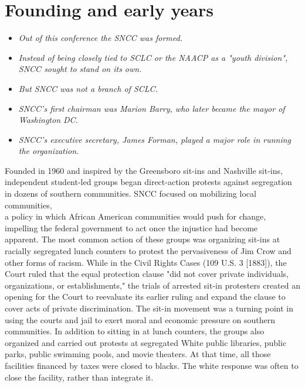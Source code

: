 \section{Founding and early years}\label{founding-and-early-years}

\begin{itemize}
\item
  \emph{Out of this conference the SNCC was formed.}
\item
  \emph{Instead of being closely tied to SCLC or the NAACP as a "youth
  division", SNCC sought to stand on its own.}
\item
  \emph{But SNCC was not a branch of SCLC.}
\item
  \emph{SNCC's first chairman was Marion Barry, who later became the
  mayor of Washington DC.}
\item
  \emph{SNCC's executive secretary, James Forman, played a major role in
  running the organization.}
\end{itemize}

Founded in 1960 and inspired by the Greensboro sit-ins and Nashville
sit-ins, independent student-led groups began direct-action protests
against segregation in dozens of southern communities. SNCC focused on
mobilizing local communities,\\
a policy in which African American communities would push for change,\\
impelling the federal government to act once the injustice had become\\
apparent. The most common action of these groups was organizing sit-ins
at racially segregated lunch counters to protest the pervasiveness of
Jim Crow and other forms of racism. While in the Civil Rights Cases (109
U.S. 3 {[}1883{]}), the Court ruled that the equal protection clause
"did not cover private individuals, organizations, or establishments,"
the trials of arrested sit-in protesters created an opening for the
Court to reevaluate its earlier ruling and expand the clause to cover
acts of private discrimination. The sit-in movement was a turning point
in using the courts and jail to exert moral and economic pressure on
southern communities. In addition to sitting in at lunch counters, the
groups also organized and carried out protests at segregated White
public libraries, public parks, public swimming pools, and movie
theaters. At that time, all those facilities financed by taxes were
closed to blacks. The white response was often to close the facility,
rather than integrate it.

